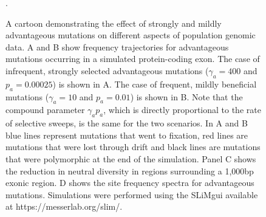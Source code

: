 \linespread{1}
\begin{figure}[h!]
   \centering      
   \noindent{}
   
 \caption{A cartoon demonstrating the effect of strongly and mildly advantageous mutations on different aspects of population genomic data. A and B show frequency trajectories for advantageous mutations occurring in a simulated protein-coding exon. The case of infrequent, strongly selected advantageous mutations ($\gamma_a = 400$ and $p_a = 0.00025$) is shown in A. The case of frequent, mildly beneficial mutations ($\gamma_a = 10$ and $p_a = 0.01$) is shown in B. Note that the compound parameter $\gamma_a p_a$, which is directly proportional to the rate of selective sweeps, is the same for the two scenarios. In A and B blue lines represent mutations that went to fixation, red lines are mutations that were lost through drift and black lines are mutations that were polymorphic at the end of the simulation. Panel C shows the reduction in neutral diversity in regions surrounding a 1,000bp exonic region. D shows the site frequency spectra for advantageous mutations. Simulations were performed using the SLiMgui available at https://messerlab.org/slim/.}.
 
 \label{fig:Cartoon}
\end{figure}
\linespread{2}

